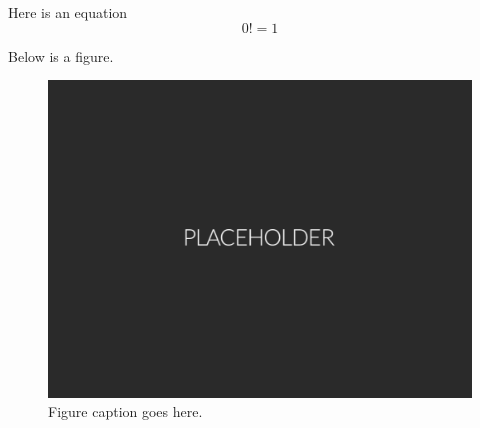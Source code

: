 \documentclass[11pt]{article}
\begin{document}
\frontmatter



Here is an equation
%
\begin{equation}
0! = 1
\end{equation}




Below is a figure.

\begin{figure}[H]
\hypertarget{fig1}{}
\centering
\includegraphics[width=0.5\columnwidth]{fig/placeholder.pdf}
\caption{Figure caption goes here.}
\end{figure}
\end{document}
